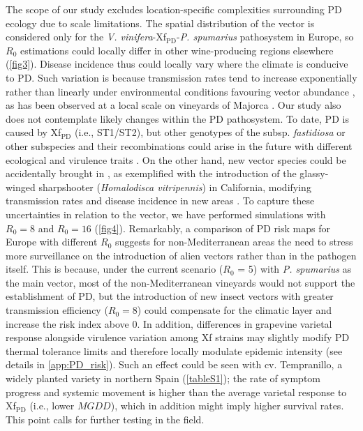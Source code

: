     The scope of our study excludes location-specific complexities surrounding
    PD
    ecology due to scale limitations. The spatial distribution of the vector is
    considered only for the \textit{V. vinifera}-Xf$_{\textrm{PD}}$-{\textit{P.
        spumarius}} pathosystem in Europe, so $R_0$ estimations could locally
    differ in
    other wine-producing regions elsewhere (\cref{fig3}). Disease incidence
    thus
    could locally vary where the climate is conducive to PD. Such variation is
    because transmission rates tend to increase exponentially rather than
    linearly
    under environmental conditions favouring vector abundance
    \cite{Gruber2012}, as
    has been observed at a local scale on vineyards of Majorca
    \cite{Moralejo2019}.
    Our study also does not contemplate likely changes within the PD
    pathosystem.
    To date, PD is caused by Xf$_{\textrm{PD}}$ (i.e., ST1/ST2), but other
    genotypes of the subsp. \textit{fastidiosa} or other subspecies and their
    recombinations could arise in the future with different ecological and
    virulence traits \cite{Vanhove2019}. On the other hand, new vector species
    could be accidentally brought in \cite{Redak2004}, as exemplified with the
    introduction of the glassy-winged sharpshooter (\textit{Homalodisca
        vitripennis}) in California, modifying transmission rates and disease
    incidence
    in new areas \cite{Daugherty2019}. To capture these uncertainties in
    relation
    to the vector, we have performed simulations with $R_0 = 8$ and $R_0 = 16$
    (\cref{fig4}). Remarkably, a comparison of PD risk maps for Europe with
    different $R_0$ suggests for non-Mediterranean areas the need to stress
    more
    surveillance on the introduction of alien vectors rather than in the
    pathogen
    itself. This is because, under the current scenario ($R_0$ = 5) with
    \textit{P.
        spumarius} as the main vector, most of the non-Mediterranean vineyards
    would
    not support the establishment of PD, but the introduction of new insect
    vectors
    with greater transmission efficiency ($R_0=8$) could compensate for the
    climatic layer and increase the risk index above 0. In addition,
    differences in
    grapevine varietal response alongside virulence variation among Xf strains
    may
    slightly modify PD thermal tolerance limits and therefore locally modulate
    epidemic intensity (see details in \cref{app:PD_risk}). Such an
    effect
    could be seen with cv. Tempranillo, a widely planted variety in northern
    Spain
    (\cref{tableS1}); the rate of symptom progress and systemic
    movement is
    higher than the average varietal response to Xf$_{\textrm{PD}}$ (i.e.,
    lower
$MGDD$), which in addition might imply higher survival rates. This point calls
    for further testing in the field.

